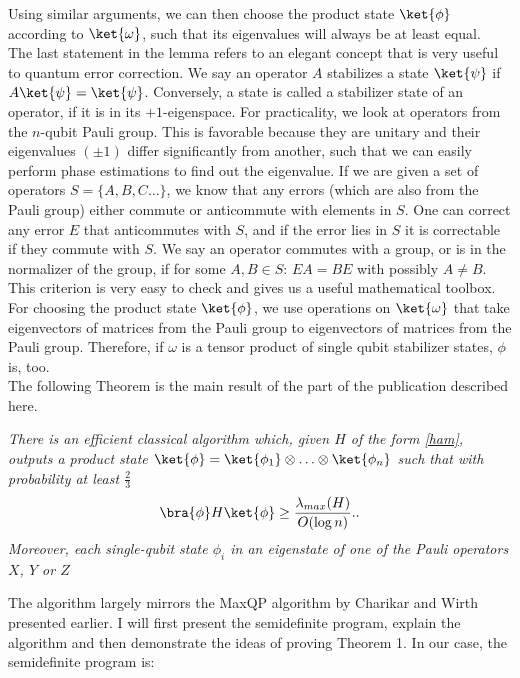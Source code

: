 Using similar arguments, we can then choose the product state $\ket{\phi}$ according to $\ket{\omega}$, such that its eigenvalues will always be at least equal.\\
The last statement in the lemma refers to an elegant concept that is very useful to quantum error correction.
We say an operator $A$ stabilizes a state $\ket{\psi}$ if $A\ket{\psi}=\ket{\psi}$.
Conversely, a state is called a stabilizer state of an operator, if it is in its $+1$-eigenspace.
For practicality, we look at operators from the $n$-qubit Pauli group.
This is favorable because they are unitary and their eigenvalues  $(\pm 1)$ differ significantly from another, such that we can easily perform phase estimations to find out the eigenvalue.
If we are given a set of operators $S=\{A,B,C\ldots\}$, we know that any errors (which are also from the Pauli group) either commute or anticommute with elements in $S$.
One can correct any error $E$ that anticommutes with $S$, and if the error lies in $S$ it is correctable if they commute with $S$.\cite{gottesman97}
We say an operator commutes with a group, or is in the normalizer of the group, if for some $A,B\in S$: $EA=BE$ with possibly $A\neq B$.
This criterion is very easy to check and gives us a useful mathematical toolbox.
For choosing the product state $\ket{\phi}$, we use operations on $\ket{\omega}$ that take eigenvectors of matrices from the Pauli group to eigenvectors of matrices from the Pauli group.
Therefore, if $\omega$ is a tensor product of single qubit stabilizer states, $\phi$ is, too.\\
The following Theorem is the main result of the part of the publication described here.
\begin{thm}\emph{
		There is an efficient classical algorithm which, given $H$ of the form \eqref{ham}, outputs a product state $\ket{\phi} = \ket{\phi_1}\otimes\ldots\otimes \ket{\phi_n}$ such that with probability at least $\frac{2}{3}$ \[
			\bra{\phi}H\ket{\phi}\ge \frac{\lambda_{max}(H)}{O(\log{}n)}.
		.\]
		Moreover, each single-qubit state $\phi_i$ in an eigenstate of one of the Pauli operators $X$, $Y$ or $Z$
}\end{thm}
The algorithm largely mirrors the MaxQP algorithm by Charikar and Wirth presented earlier.
I will first present the semidefinite program, explain the algorithm and then demonstrate the ideas of proving Theorem 1.
In our case, the semidefinite program is:
